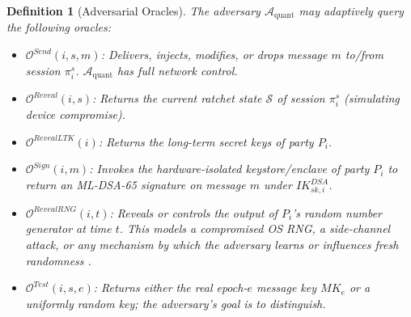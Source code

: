 \documentclass[11pt,a4paper]{article}
\newtheorem{definition}[theorem]{Definition}
\theoremstyle{remark}
\theoremstyle{plain}
\newcommand{\calA}{\mathcal{A}}
\newcommand{\calO}{\mathcal{O}}
\begin{document}
\begin{definition}[Adversarial Oracles]
\label{def:oracles}
The adversary $\calA_{\mathrm{quant}}$ may adaptively query the following oracles:
\begin{itemize}
  \item $\calO^{Send}(i, s, m)$: Delivers, injects, modifies, or drops message $m$ to/from
        session $\pi^s_i$.  $\calA_{\mathrm{quant}}$ has full network control.
  \item $\calO^{Reveal}(i, s)$: Returns the current ratchet state $\mathcal{S}$ of session
        $\pi^s_i$ (simulating device compromise).
  \item $\calO^{RevealLTK}(i)$: Returns the long-term secret keys of party $P_i$.
  \item $\calO^{Sign}(i, m)$: Invokes the hardware-isolated keystore/enclave of party $P_i$ to
        return an ML-DSA-65 signature on message $m$ under $IK^{DSA}_{sk,i}$.
  \item $\calO^{RevealRNG}(i, t)$: Reveals or controls the output of $P_i$'s random number
        generator at time $t$.  This models a compromised OS RNG, a side-channel attack, or
        any mechanism by which the adversary learns or influences fresh randomness
        \cite{dodis2013entropic}.
  \item $\calO^{Test}(i, s, e)$: Returns either the real epoch-$e$ message key $MK_e$ or a
        uniformly random key; the adversary's goal is to distinguish.
\end{itemize}
\end{definition}
\end{document}
